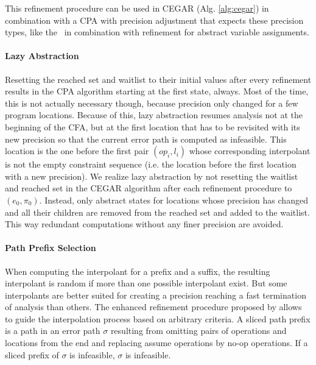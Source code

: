 This refinement procedure can be used in CEGAR (Alg. \ref{alg:cegar}) in combination with a CPA with precision adjustment that expects these precision types, like the \ in combination with refinement for abstract variable assignments.

\paragraph*{Lazy Abstraction}
Resetting the reached set and waitlist to their initial values after every refinement results in the CPA algorithm starting at the first state, always.
Most of the time, this is not actually necessary though, because precision only changed for a few program locations.
Because of this, lazy abstraction \cite{Henzinger2002} resumes analysis not at the beginning of the CFA, but at the first location that has to be revisited with its new precision so that the current error path is computed as infeasible.
This location is the one before the first pair $(op_i, l_i)$ whose corresponding interpolant is not the empty constraint sequence (i.e. the location before the first location with a new precision).
We realize lazy abstraction by not resetting the waitlist and reached set in the CEGAR algorithm after each refinement procedure to $(e_0, \pi_0)$.
Instead, only abstract states for locations whose precision has changed and all their children are removed from the reached set and added to the waitlist.
This way redundant computations without any finer precision are avoided.

\paragraph*{Path Prefix Selection}
When computing the interpolant for a prefix and a suffix, the resulting interpolant is random if more than one possible interpolant exist. But some interpolants are better suited for creating a precision reaching a fast termination of analysis than others.
The enhanced refinement procedure proposed by \cite{Beyer2015} allows to guide the interpolation process based on arbitrary criteria.
A sliced path prefix is a path in an error path $\sigma$ resulting from omitting pairs of operations and locations from the end and replacing assume operations by no-op operations. If a sliced prefix of $\sigma$ is infeasible, $\sigma$ is infeasible.\cite{Beyer2015}

